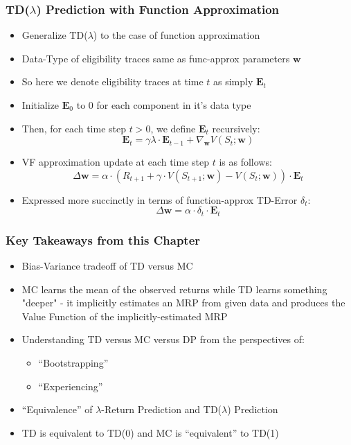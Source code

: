 \documentclass[handout]{beamer}
\begin{document}
\begin{frame}
\frametitle{TD($\lambda$) Prediction with Function Approximation}
\pause
\begin{itemize}[<+->]
\item Generalize TD($\lambda$) to the case of function approximation
\item Data-Type of eligibility traces same as func-approx parameters $\bm{w}$
\item So here we denote eligibility traces at time $t$ as simply $\bm{E}_t$
\item Initialize $\bm{E}_0$ to 0 for each component in it's data type
\item Then, for each time step $t > 0$, we define $\bm{E}_t$ recursively:
$$\bm{E}_t = \gamma \lambda \cdot \bm{E}_{t-1} + \nabla_{\bm{w}} V(S_t;\bm{w})$$
\item VF approximation update at each time step $t$ is as follows:
$$\Delta \bm{w} = \alpha \cdot (R_{t+1} + \gamma \cdot V(S_{t+1}; \bm{w}) - V(S_t; \bm{w})) \cdot \bm{E}_t$$
\item Expressed more succinctly in terms of function-approx TD-Error $\delta_t$:
$$\Delta \bm{w} = \alpha \cdot \delta_t \cdot \bm{E}_t$$
\end{itemize}
\end{frame}


\begin{frame}
\frametitle{Key Takeaways from this Chapter}
\pause
\begin{itemize}[<+->]
\item Bias-Variance tradeoff of TD versus MC
\item MC learns the mean of the observed returns while TD learns something "deeper" - it implicitly estimates an MRP from given data and produces the Value Function of the implicitly-estimated MRP
\item Understanding TD versus MC versus DP from the perspectives of:
\begin{itemize}[<+->]
\item ``Bootstrapping''
\item ``Experiencing''
\end{itemize}
\item ``Equivalence'' of $\lambda$-Return Prediction and TD($\lambda$) Prediction
\item TD is equivalent to TD(0) and MC is ``equivalent'' to TD(1)
\end{itemize}
\end{frame}
\end{document}
